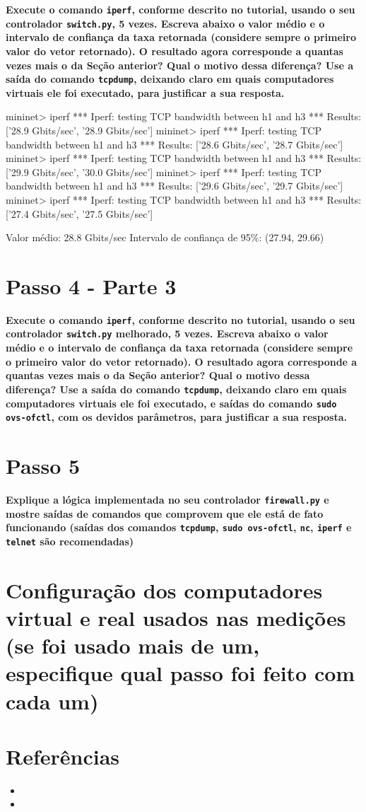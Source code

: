\documentclass[12pt,letterpaper]{article}
\begin{document}
\textbf{Execute o comando \texttt{iperf}, conforme descrito no
tutorial, usando o seu controlador \texttt{switch.py}, 5 vezes.
Escreva abaixo o valor médio e o intervalo de confiança da taxa
retornada (considere sempre o primeiro valor do vetor retornado). O
resultado agora corresponde a quantas vezes mais o da Seção anterior?
Qual o motivo dessa diferença? Use a saída do comando
\texttt{tcpdump}, deixando claro em quais computadores virtuais ele
foi executado, para justificar a sua resposta.}

mininet> iperf 
*** Iperf: testing TCP bandwidth between h1 and h3 
*** Results: ['28.9 Gbits/sec', '28.9 Gbits/sec'] 
mininet> iperf 
*** Iperf: testing TCP bandwidth between h1 and h3 
*** Results: ['28.6 Gbits/sec', '28.7 Gbits/sec'] 
mininet> iperf 
*** Iperf: testing TCP bandwidth between h1 and h3 
*** Results: ['29.9 Gbits/sec', '30.0 Gbits/sec'] 
mininet> iperf 
*** Iperf: testing TCP bandwidth between h1 and h3 
*** Results: ['29.6 Gbits/sec', '29.7 Gbits/sec'] 
mininet> iperf 
*** Iperf: testing TCP bandwidth between h1 and h3 
*** Results: ['27.4 Gbits/sec', '27.5 Gbits/sec']

Valor médio: 28.8 Gbits/sec
Intervalo de confiança de 95\%: (27.94, 29.66)

\section{Passo 4 - Parte 3}

\textbf{Execute o comando \texttt{iperf}, conforme descrito no
tutorial, usando o seu controlador \texttt{switch.py} melhorado, 5
vezes. Escreva abaixo o valor médio e o intervalo de confiança da taxa
retornada (considere sempre o primeiro valor do vetor retornado). O
resultado agora corresponde a quantas vezes mais o da Seção anterior?
Qual o motivo dessa diferença? Use a saída do comando
\texttt{tcpdump}, deixando claro em quais computadores virtuais ele
foi executado, e saídas do comando \texttt{sudo ovs-ofctl}, com os
devidos parâmetros, para justificar a sua resposta.}

\section{Passo 5}

\textbf{Explique a lógica implementada no seu controlador
\texttt{firewall.py} e mostre saídas de comandos que comprovem que ele
está de fato funcionando (saídas dos comandos \texttt{tcpdump},
\texttt{sudo ovs-ofctl}, \texttt{nc}, \texttt{iperf} e \texttt{telnet}
são recomendadas)}

\section{Configuração dos computadores virtual e real usados nas
medições (se foi usado mais de um, especifique qual passo foi feito
com cada um)}

\section{Referências}

\begin{itemize}
   \item
   \item
\end{itemize}
\end{document}

